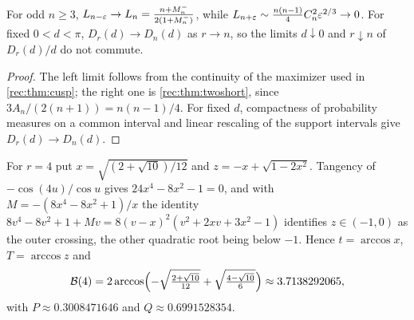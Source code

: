 \begin{corollary}\label{fil:cor:kappa}
For odd $n\ge3$, $L_{n-\varepsilon}\to L_n=\frac{n+M_n^-}{2(1+M_n^-)}$, while $L_{n+\varepsilon}\sim\frac{n(n-1)}4C_n^2\varepsilon^{2/3}\to0$.
For fixed $0<d<\pi$, $D_r(d)\to D_n(d)$ as $r\to n$, so the limits $d\downarrow0$ and $r\downarrow n$ of
$D_r(d)/d$ do not commute.
\end{corollary}

\begin{proof}
The left limit follows from the continuity of the maximizer used in \cref{rec:thm:cusp}; the right one is
\cref{rec:thm:twoshort}, since $3A_n/(2(n+1))=n(n-1)/4$. For fixed $d$, compactness of probability measures on
a common interval and linear rescaling of the support intervals give $D_r(d)\to D_n(d)$.
\end{proof}

\begin{example}\label{rec:ex:ratio4}
For $r=4$ put $x=\sqrt{(2+\sqrt{10})/12}$ and $z=-x+\sqrt{1-2x^2}$. Tangency of $-\cos(4u)/\cos u$ gives
$24x^4-8x^2-1=0$, and with $M=-(8x^4-8x^2+1)/x$ the identity $8v^4-8v^2+1+Mv=8(v-x)^2(v^2+2xv+3x^2-1)$ identifies
$z\in(-1,0)$ as the outer crossing, the other quadratic root being below $-1$. Hence $t=\arccos x$,
$T=\arccos z$ and
\[
 \mathcal B(4)=2\arccos\Bigl(-\sqrt{\tfrac{2+\sqrt{10}}{12}}+\sqrt{\tfrac{4-\sqrt{10}}6}\Bigr)\approx3.7138292065,
\]
with $P\approx0.3008471646$ and $Q\approx0.6991528354$.
\end{example}

